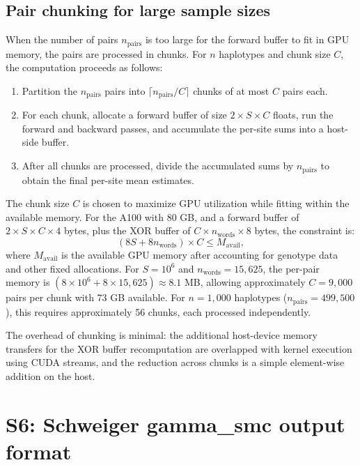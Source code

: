 \documentclass[10pt,letterpaper]{article}
\begin{document}
\subsection{Pair chunking for large sample sizes}

When the number of pairs $n_{\mathrm{pairs}}$ is too large for the forward buffer to fit in GPU memory, the pairs are processed in chunks. For $n$ haplotypes and chunk size $C$, the computation proceeds as follows:
\begin{enumerate}
\item Partition the $n_{\mathrm{pairs}}$ pairs into $\lceil n_{\mathrm{pairs}} / C \rceil$ chunks of at most $C$ pairs each.
\item For each chunk, allocate a forward buffer of size $2 \times S \times C$ floats, run the forward and backward passes, and accumulate the per-site sums into a host-side buffer.
\item After all chunks are processed, divide the accumulated sums by $n_{\mathrm{pairs}}$ to obtain the final per-site mean estimates.
\end{enumerate}

The chunk size $C$ is chosen to maximize GPU utilization while fitting within the available memory. For the A100 with 80 GB, and a forward buffer of $2 \times S \times C \times 4$ bytes, plus the XOR buffer of $C \times n_{\mathrm{words}} \times 8$ bytes, the constraint is:
\begin{equation}
(8S + 8 n_{\mathrm{words}}) \times C \leq M_{\mathrm{avail}},
\end{equation}
where $M_{\mathrm{avail}}$ is the available GPU memory after accounting for genotype data and other fixed allocations. For $S = 10^6$ and $n_{\mathrm{words}} = 15{,}625$, the per-pair memory is $(8 \times 10^6 + 8 \times 15{,}625) \approx 8.1$ MB, allowing approximately $C = 9{,}000$ pairs per chunk with 73 GB available. For $n = 1{,}000$ haplotypes ($n_{\mathrm{pairs}} = 499{,}500$), this requires approximately 56 chunks, each processed independently.

The overhead of chunking is minimal: the additional host-device memory transfers for the XOR buffer recomputation are overlapped with kernel execution using CUDA streams, and the reduction across chunks is a simple element-wise addition on the host.


\section{S6: Schweiger gamma\_smc output format}
\end{document}
